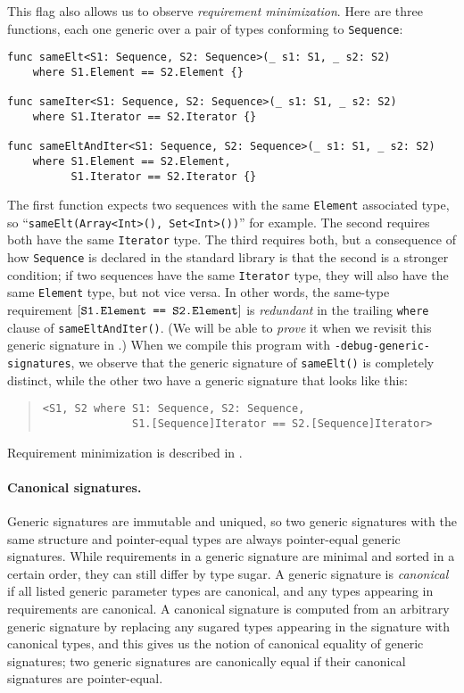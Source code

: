 \documentclass[../generics]{subfiles}
\begin{document}
This flag also allows us to observe \emph{requirement minimization}. Here are three functions, each one generic over a pair of types conforming to \texttt{Sequence}:
\begin{Verbatim}
func sameElt<S1: Sequence, S2: Sequence>(_ s1: S1, _ s2: S2)
    where S1.Element == S2.Element {}

func sameIter<S1: Sequence, S2: Sequence>(_ s1: S1, _ s2: S2)
    where S1.Iterator == S2.Iterator {}

func sameEltAndIter<S1: Sequence, S2: Sequence>(_ s1: S1, _ s2: S2)
    where S1.Element == S2.Element,
          S1.Iterator == S2.Iterator {}
\end{Verbatim}
The first function expects two sequences with the same \texttt{Element} associated type, so ``\verb|sameElt(Array<Int>(), Set<Int>())|'' for example. The second requires both have the same \texttt{Iterator} type. The third requires both, but a consequence of how \texttt{Sequence} is declared in the standard library is that the second is a stronger condition; if two sequences have the same \texttt{Iterator} type, they will also have the same \texttt{Element} type, but not vice versa. In other words, the same-type requirement $[\texttt{S1.Element == S2.Element}]$ is \emph{redundant} in the trailing \texttt{where} clause of \texttt{sameEltAndIter()}. (We will be able to \emph{prove} it when we revisit this generic signature in .) When we compile this program with \texttt{-debug-generic-signatures}, we observe that the generic signature of \texttt{sameElt()} is completely distinct, while the other two have a generic signature that looks like this:
\begin{quote}
\begin{verbatim}
<S1, S2 where S1: Sequence, S2: Sequence,
              S1.[Sequence]Iterator == S2.[Sequence]Iterator>
\end{verbatim}
\end{quote}
Requirement minimization is described in .

\paragraph{Canonical signatures.}
Generic signatures are immutable and uniqued, so two generic signatures with the same structure and pointer-equal types are always pointer-equal generic signatures. While requirements in a generic signature are minimal and sorted in a certain order, they can still differ by type sugar. A generic signature is \emph{canonical} if all listed generic parameter types are canonical, and any types appearing in requirements are canonical. A canonical signature is computed from an arbitrary generic signature by replacing any sugared types appearing in the signature with canonical types, and this gives us the notion of canonical equality of generic signatures; two generic signatures are canonically equal if their canonical signatures are pointer-equal.
\end{document}
